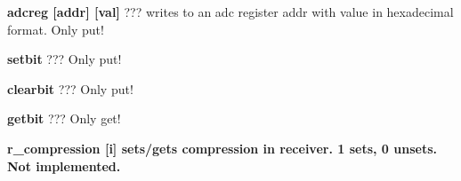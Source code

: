 \begin{DoxyItemize}
\item {\bfseries adcreg \mbox{[}addr\mbox{]} \mbox{[}val\mbox{]}} ??? writes to an adc register {\ttfamily addr} with {\ttfamily value} in hexadecimal format. Only put!
\end{DoxyItemize}


\begin{DoxyItemize}
\item {\bfseries setbit} ??? Only put!
\end{DoxyItemize}


\begin{DoxyItemize}
\item {\bfseries clearbit } ??? Only put!
\end{DoxyItemize}


\begin{DoxyItemize}
\item {\bfseries getbit } ??? Only get!
\end{DoxyItemize}


\begin{DoxyItemize}
\item {\bfseries r\_\-compression \mbox{[}i\mbox{]} sets/gets compression in receiver. 1 sets, 0 unsets. Not implemented.} 
\end{DoxyItemize}